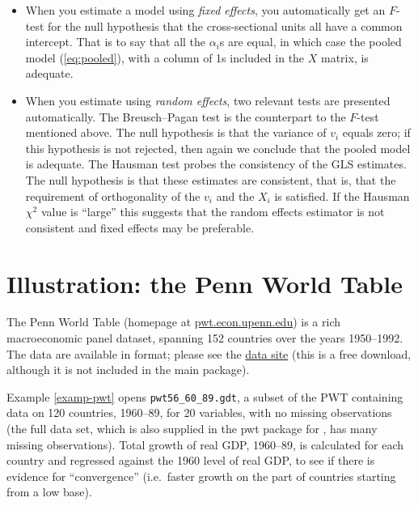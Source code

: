 \begin{itemize}
\item When you estimate a model using \textsl{fixed effects}, you
  automatically get an $F$-test for the null hypothesis that the
  cross-sectional units all have a common intercept.  That is to say
  that all the $\alpha_i$s are equal, in which case the pooled model
  (\ref{eq:pooled}), with a column of 1s included in the $X$ matrix,
  is adequate.
\item When you estimate using \textsl{random effects}, two relevant
  tests are presented automatically.  The Breusch--Pagan test is the
  counterpart to the $F$-test mentioned above.  The null hypothesis is
  that the variance of $v_i$ equals zero; if this hypothesis is not
  rejected, then again we conclude that the pooled model is adequate.
  The Hausman test probes the consistency of the GLS estimates.  The
  null hypothesis is that these estimates are consistent, that is,
  that the requirement of orthogonality of the $v_i$ and the $X_i$ is
  satisfied.  If the Hausman $\chi^2$ value is ``large'' this suggests
  that the random effects estimator is not consistent and fixed
  effects may be preferable.
\end{itemize}



\section{Illustration: the Penn World Table}
\label{PWT}

The Penn World Table (homepage at
\href{http://pwt.econ.upenn.edu/}{pwt.econ.upenn.edu}) is a rich
macroeconomic panel dataset, spanning 152 countries over the years
1950--1992.  The data are available in  format; please see
the 
\href{http://gretl.sourceforge.net/gretl_data.html}{data site} (this
is a free download, although it is not included in the main
 package).

Example \ref{examp-pwt} opens \verb+pwt56_60_89.gdt+, a subset
of the PWT containing data on 120 countries, 1960--89, for 20
variables, with no missing observations (the full data set, which is
also supplied in the pwt package for , has many missing
observations). Total growth of real GDP, 1960--89, is calculated for
each country and regressed against the 1960 level of real GDP, to see
if there is evidence for ``convergence'' (i.e.\ faster growth on the
part of countries starting from a low base).


